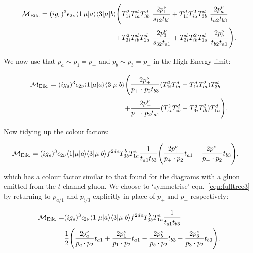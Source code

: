 	\begin{align}
	\begin{split}
	    \mathcal{M}_{\text{Eik.}} = (ig_s)^3 \epsilon_{2\nu} \langle 1 | \mu | a \rangle \langle 3 | \mu | b \rangle \Bigg(
	     &T^2_{1i}T^d_{ia}T^d_{3b}\ \frac{2p_1^\nu}{s_{12}t_{b3}}
	    + T^d_{1i}T^2_{ia}T^d_{3b}\ \frac{2p_a^\nu}{t_{a2}t_{b3}} \\
	    +&T^2_{3i}T^d_{ib}T^d_{1a}\ \frac{2p_3^\nu}{s_{32}t_{a1}}
	    + T^d_{3i}T^2_{ib}T^d_{1a}\ \frac{2p_b^\nu}{t_{b2}t_{a1}}\Bigg).
		\label{eq:fulltree2}
	\end{split}
	\end{align}

	We now use that $p_a\sim p_1=p_+$ and $p_b\sim p_3=p_-$ in the High Energy limit:

	\begin{align}
	\begin{split}
		\mathcal{M}_{\text{Eik.}} = (ig_s)^3 \epsilon_{2\nu} \langle 1 | \mu | a \rangle \langle 3 | \mu | b \rangle \Bigg(&
		\frac{2p_+^\nu}{p_+\cdot p_2 t_{b3}}(T^2_{1i}T^d_{ia} - T^d_{1i}T^2_{ia})T^d_{3b}\\
		+ &\frac{2p_-^\nu}{p_-\cdot p_2 t_{a1}}(T^2_{3i}T^d_{ib} - T^d_{3i}T^2_{ib})T^d_{1a}\Bigg).\\
	\end{split}
	\end{align}

	Now tidying up the colour factors:

	\begin{align}
	\begin{split}
		\mathcal{M}_{\text{Eik.}} = (ig_s)^3 \epsilon_{2\nu} \langle 1 | \mu | a \rangle \langle 3 | \mu | b \rangle
		f^{2de}T^b_{3b}T^e_{1a}\frac{1}{t_{a1}t_{b3}}\Bigg(&
		\frac{2p_+^\nu}{p_+\cdot p_2}t_{a1} - \frac{2p_-^\nu}{p_-\cdot p_2}t_{b3}\Bigg),
		\label{eq:fulltree3}
	\end{split}
	\end{align}

	which has a colour factor similar to that found for the diagrams with a gluon emitted from the
	$t$-channel gluon.  We choose to `symmetrise' eqn.~\eqref{eqn:fulltree3} by returning to $p_{a/1}$
	and $p_{b/3}$ explicitly in place of $p_+$ and $p_-$ respectively:

	\begin{align}
	\begin{split}
		\mathcal{M}_{\text{Eik.}} = &(ig_s)^3 \epsilon_{2\nu} \langle 1 | \mu | a \rangle \langle 3 | \mu | b \rangle f^{2de}T^b_{3b}T^e_{1a}\frac{1}{t_{a1}t_{b3}}\\
		&\frac{1}{2}\Bigg(\frac{2p_a^\nu}{p_a\cdot p_2}t_{a1} + \frac{2p_1^\nu}{p_1\cdot p_2}t_{a1} -
		\frac{2p_b^\nu}{p_b\cdot p_2}t_{b3} - \frac{2p_3^\nu}{p_3\cdot p_2}t_{b3}\Bigg).
		\label{eq:fulltree4}
	\end{split}
	\end{align}


